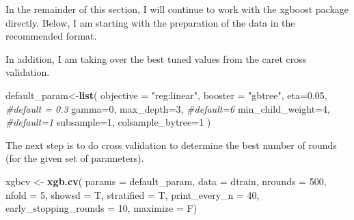 \documentclass[]{article}
\newenvironment{Shaded}{\begin{snugshade}}{\end{snugshade}}
\newcommand{\CommentTok}[1]{\textcolor[rgb]{0.56,0.35,0.01}{\textit{#1}}}
\newcommand{\DataTypeTok}[1]{\textcolor[rgb]{0.13,0.29,0.53}{#1}}
\newcommand{\DecValTok}[1]{\textcolor[rgb]{0.00,0.00,0.81}{#1}}
\newcommand{\FloatTok}[1]{\textcolor[rgb]{0.00,0.00,0.81}{#1}}
\newcommand{\KeywordTok}[1]{\textcolor[rgb]{0.13,0.29,0.53}{\textbf{#1}}}
\newcommand{\NormalTok}[1]{#1}
\newcommand{\OperatorTok}[1]{\textcolor[rgb]{0.81,0.36,0.00}{\textbf{#1}}}
\newcommand{\StringTok}[1]{\textcolor[rgb]{0.31,0.60,0.02}{#1}}
\begin{document}
In the remainder of this section, I will continue to work with the
xgboost package directly. Below, I am starting with the preparation of
the data in the recommended format.

\begin{Shaded}
\end{Shaded}

In addition, I am taking over the best tuned values from the caret cross
validation.

\begin{Shaded}
\begin{Highlighting}[]
\NormalTok{default_param<-}\KeywordTok{list}\NormalTok{(}
        \DataTypeTok{objective =} \StringTok{"reg:linear"}\NormalTok{,}
        \DataTypeTok{booster =} \StringTok{"gbtree"}\NormalTok{,}
        \DataTypeTok{eta=}\FloatTok{0.05}\NormalTok{, }\CommentTok{#default = 0.3}
        \DataTypeTok{gamma=}\DecValTok{0}\NormalTok{,}
        \DataTypeTok{max_depth=}\DecValTok{3}\NormalTok{, }\CommentTok{#default=6}
        \DataTypeTok{min_child_weight=}\DecValTok{4}\NormalTok{, }\CommentTok{#default=1}
        \DataTypeTok{subsample=}\DecValTok{1}\NormalTok{,}
        \DataTypeTok{colsample_bytree=}\DecValTok{1}
\NormalTok{)}
\end{Highlighting}
\end{Shaded}

The next step is to do cross validation to determine the best number of
rounds (for the given set of parameters).

\begin{Shaded}
\begin{Highlighting}[]
\NormalTok{xgbcv <-}\StringTok{ }\KeywordTok{xgb.cv}\NormalTok{( }\DataTypeTok{params =}\NormalTok{ default_param, }\DataTypeTok{data =}\NormalTok{ dtrain, }\DataTypeTok{nrounds =} \DecValTok{500}\NormalTok{, }\DataTypeTok{nfold =} \DecValTok{5}\NormalTok{, }\DataTypeTok{showsd =}\NormalTok{ T, }\DataTypeTok{stratified =}\NormalTok{ T, }\DataTypeTok{print_every_n =} \DecValTok{40}\NormalTok{, }\DataTypeTok{early_stopping_rounds =} \DecValTok{10}\NormalTok{, }\DataTypeTok{maximize =}\NormalTok{ F)}
\end{Highlighting}
\end{Shaded}
\end{document}
